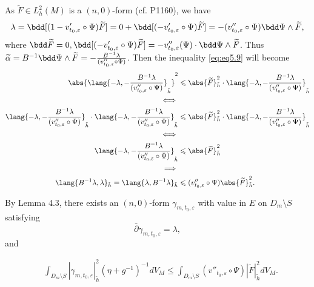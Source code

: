 \begin{remark}
  As $\widetilde{F}\in L_h^2(M)$ is a $(n,0)$-form (cf. P1160), we have $$\lambda=\bdd [(1-v_{t_0,\varepsilon}'\circ\Psi)\widetilde{F}]=0+\bdd[(-v_{t_0,\varepsilon}'\circ\Psi)\widetilde{F}]=-(v_{t_0,\varepsilon}''\circ\Psi)\bdd\Psi\wedge\widetilde{F},$$ 
  where $\bdd \widetilde{F}=0, \bdd[(-v_{t_0,\varepsilon}'\circ\Psi)\widetilde{F}]=-v_{t_0,\varepsilon}''(\Psi)\cdot \bdd\Psi\wedge \widetilde{F}$.
  Thus $\widetilde{\alpha}=B^{-1}\bdd \Psi\wedge \widetilde{F}=-\frac{B^{-1}\lambda}{(v_{t_0,\varepsilon}''\circ\Psi)}$. Then the inequality \eqref{eq:eq5.9} will become
  \begin{align*}
\abs{\lang{-\lambda,-\frac{B^{-1}\lambda}{(v_{t_0,\varepsilon}''\circ\Psi)}}_{\tilde{h}}}^2 &\leqslant \abs{\widetilde{F}}^2_{\tilde{h}}\cdot \lang{-\lambda,-\frac{B^{-1}\lambda}{(v_{t_0,\varepsilon}''\circ\Psi)}}_{\tilde{h}}\\ 
\iff\\
\lang{-\lambda,-\frac{B^{-1}\lambda}{(v_{t_0,\varepsilon}''\circ\Psi)}}_{\tilde{h}}\cdot \lang{-\lambda,-\frac{B^{-1}\lambda}{(v_{t_0,\varepsilon}''\circ\Psi)}}_{\tilde{h}} & \leqslant \abs{\widetilde{F}}^2_{\tilde{h}}\cdot \lang{-\lambda,-\frac{B^{-1}\lambda}{(v_{t_0,\varepsilon}''\circ\Psi)}}_{\tilde{h}}\\ 
\iff\\ 
\lang{-\lambda,-\frac{B^{-1}\lambda}{(v_{t_0,\varepsilon}''\circ\Psi)}}_{\tilde{h}}& \leqslant \abs{\widetilde{F}}^2_{\tilde{h}}\\ 
\implies\\ 
\lang{B^{-1}\lambda,\lambda}_{\tilde{h}}=\lang{\lambda,B^{-1}\lambda}_{\tilde{h}}& \leqslant (v_{t_0,\varepsilon}''\circ\Psi)\abs{\widetilde{F}}^2_{\tilde{h}}.
  \end{align*}
\end{remark}

By Lemma 4.3, there exists an $(n,0)$-form
$\gamma_{m,t_0,\varepsilon}$ with value in $E$ on $D_{m}\setminus S$
satisfying
$$\bar{\partial}\gamma_{m,t_0,\varepsilon}=\lambda,$$
and

\begin{equation}
 \label{equ:smooth.vector3.2}
 \begin{split}
 &\int_{ D_m\setminus S}|\gamma_{m,t_0,\varepsilon}|^{2}_{\tilde{h}}(\eta+g^{-1})^{-1}dV_{M}
  \leq\int_{D_m\setminus S}(v''_{t_0,\varepsilon}\circ{\Psi})| \tilde{F}|^2_{\tilde{h}}dV_M.
  \end{split}
\end{equation}

